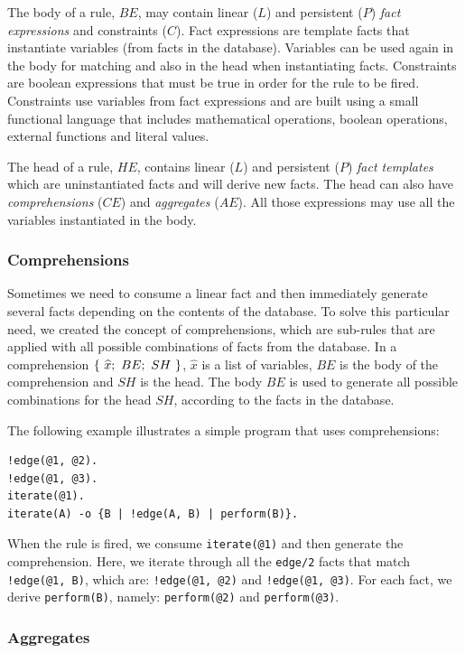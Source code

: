 The body of a rule, $BE$, may contain linear ($L$) and persistent ($P$) \emph{fact expressions}
and constraints ($C$). Fact expressions are template facts that instantiate variables
(from facts in the database). Variables can be used again in the body for matching and
also in the head when instantiating facts. Constraints are boolean expressions that must
be true in order for the rule to be fired. Constraints use variables from fact expressions and are built using a small functional language that includes mathematical operations, boolean operations, external functions and literal values.

The head of a rule, $HE$, contains linear ($L$) and persistent ($P$) \emph{fact templates} which are uninstantiated facts and will derive new facts. The head can also have \emph{comprehensions} ($CE$) and \emph{aggregates} ($AE$). All those expressions
may use all the variables instantiated in the body.

\subsubsection{Comprehensions}

Sometimes we need to consume a linear fact and then immediately generate several facts depending on
the contents of the database. To solve this particular need, we created the concept of comprehensions, which are
sub-rules that are applied with all possible combinations of facts from the database. In a comprehension $\{~\widehat{x};~BE;~SH~\}$,
$\widehat{x}$ is a list of variables, $BE$ is the body of the comprehension and $SH$ is the head.
The body $BE$ is used to generate all possible combinations for the head $SH$, according to the facts
in the database.

The following example illustrates a simple program that uses comprehensions:

\begin{Verbatim}
!edge(@1, @2).
!edge(@1, @3).
iterate(@1).
iterate(A) -o {B | !edge(A, B) | perform(B)}.
\end{Verbatim}

When the rule is fired, we consume \texttt{iterate(@1)} and then generate the comprehension. Here, we iterate through
all the \texttt{edge/2} facts that match \texttt{!edge(@1, B)}, which are: \texttt{!edge(@1, @2)} and \texttt{!edge(@1, @3)}.
For each fact, we derive \texttt{perform(B)}, namely: \texttt{perform(@2)} and \texttt{perform(@3)}.

\subsubsection{Aggregates}

